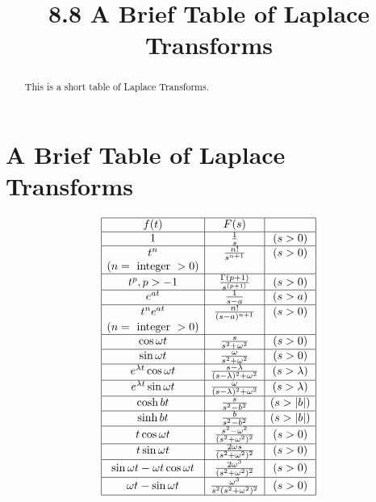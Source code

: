 \documentclass{ximera}
\title{8.8 A Brief Table of Laplace Transforms}%
\begin{document}
 
\begin{abstract}
This is a short table of Laplace Transforms.
\end{abstract}
 
\maketitle
 
\section*{A Brief Table of Laplace Transforms}
 
$$
\begin{array}{|c|c|c|}
\hline
    f(t)  &  F(s)  &   \\
\hline
  1  &  \frac{1}{s} & (s > 0)\\
\hline
  t^n  &  \frac{n!}{s^{n+1}}  & (s > 0) \\
  (n = \text{ integer } > 0)  & & \\
\hline
  t^p,  p > -1  & \frac{\Gamma (p+1)}{s^{(p+1)}} & (s>0) \\
\hline
  e^{at}  &  \frac{1}{s-a}  & (s > a) \\
\hline
  t^ne^{at}  &  \frac{n!}{(s-a)^{n+1}}  & (s > 0) \\
  (n= \text{ integer } > 0)  & & \\
\hline 
  \cos \omega t  & \frac{s}{s^2+\omega^2}  & (s > 0) \\
\hline
 \sin \omega t  & \frac{\omega}{s^2+\omega^2}  & (s > 0) \\
\hline
  e^{\lambda t} \cos \omega t  & \frac{s - \lambda}{(s-\lambda)^2+\omega^2}  & (s >
\lambda) \\
\hline
 e^{\lambda t} \sin \omega t  &
\frac{\omega}{(s-\lambda)^2+\omega^2}  & (s >
\lambda) \\
\hline
  \cosh bt  &  \frac{s}{s^2-b^2}  & (s > |b|)\\
  \hline
  \sinh bt  &  \frac{b}{s^2-b^2}  & (s > |b|) \\
  \hline
 t \cos \omega t  &
\frac{s^2-\omega^2}{(s^2+\omega^2)^2}  & (s>0)\\
\hline
  t \sin \omega t  &
\frac{2\omega s}{(s^2+\omega^2)^2}  & (s>0)\\
\hline
  \sin \omega t -\omega t\cos  \omega t
 & \frac{2\omega^3}{(s^2+\omega^2)^2} & (s>0)\\
 \hline
  \omega t - \sin  \omega t   &
\frac{\omega^3}{s^2(s^2+\omega^2)^2} & (s>0) \\
\hline

\end{array}$$
\end{document}
